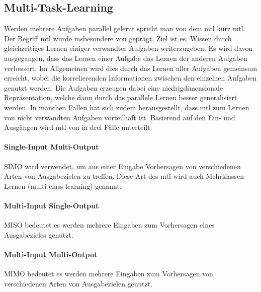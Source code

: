 		\subsection{Multi-Task-Learning}
		Werden mehrere Aufgaben parallel gelernt spricht man von dem \acl{mtl} kurz \ac{mtl}. Der Begriff \ac{mtl} wurde insbesondere von \cite{Caruana.1998} geprägt. Ziel ist es, Wissen durch gleichzeitiges Lernen einiger verwandter Aufgaben weiterzugeben. Es wird davon ausgegangen, dass das Lernen einer Aufgabe das Lernen der anderen Aufgaben verbessert. Im Allgemeinen wird dies durch das Lernen aller Aufgaben gemeinsam erreicht, wobei die korrelierenden Informationen zwischen den einzelnen Aufgaben genutzt werden. Die Aufgaben erzeugen dabei eine niedrigdimensionale Repräsentation, welche dann durch das parallele Lernen besser generalisiert werden. In manchen Fällen hat sich zudem herausgestellt, dass \acl{mtl} zum Lernen von nicht verwandten Aufgaben vorteilhaft ist.
		Basierend auf den Ein- und Ausgängen wird \ac{mtl} von \cite{Thung.2018} in drei Fälle unterteilt. 
 		
 		\paragraph{Single-Input Multi-Output} SIMO wird verwendet, um aus einer Eingabe Vorhersagen von verschiedenen Arten von Ausgabezielen zu treffen. Diese Art des \ac{mtl} wird auch Mehrklassen-Lernen (multi-class learning) genannt.
		
		\paragraph{Multi-Input Single-Output} MISO bedeutet es werden mehrere Eingaben zum Vorhersagen eines Ausgabezieles genutzt.
	
		\paragraph{Multi-Input Multi-Output} MIMO bedeutet es werden mehrere Eingaben zum Vorhersagen von verschiedenen Arten von Ausgabezielen genutzt.
		
